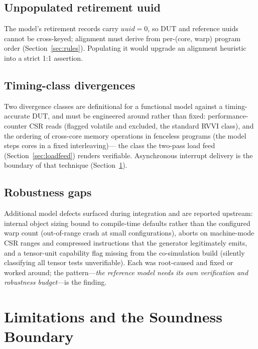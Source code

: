 \documentclass[conference]{IEEEtran}
\begin{document}
\subsection{Unpopulated retirement uuid}
The model's retirement records carry $\textit{uuid} = 0$, so DUT and
reference uuids cannot be cross-keyed; alignment must derive from
per-(core, warp) program order (Section~\ref{sec:rules}). Populating it
would upgrade an alignment heuristic into a strict 1:1 assertion.

\subsection{Timing-class divergences}
Two divergence classes are definitional for a functional model against
a timing-accurate DUT, and must be engineered around rather than fixed:
performance-counter CSR reads (flagged volatile and excluded, the
standard RVVI class), and the ordering of cross-core memory operations
in fenceless programs (the model steps cores in a fixed interleaving)---
the class the two-pass load feed (Section~\ref{sec:loadfeed}) renders
verifiable. Asynchronous interrupt delivery is the boundary of that
technique (Section~\ref{sec:limits}).

\subsection{Robustness gaps}
Additional model defects surfaced during integration and are reported
upstream: internal object sizing bound to compile-time defaults rather
than the configured warp count (out-of-range crash at small
configurations), aborts on machine-mode CSR ranges and compressed
instructions that the generator legitimately emits, and a tensor-unit
capability flag missing from the co-simulation build (silently
classifying all tensor tests unverifiable). Each was root-caused and
fixed or worked around; the pattern---\emph{the reference model needs
its own verification and robustness budget}---is the finding.

\section{Limitations and the Soundness Boundary}
\label{sec:limits}
\end{document}
